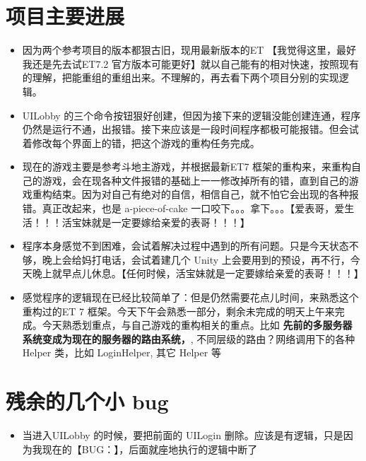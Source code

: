 \documentclass[9pt, b5paper]{article}
\begin{document}
\section{项目主要进展}
\label{sec-3}
\begin{itemize}
\item 因为两个参考项目的版本都狠古旧，现用最新版本的ET 【我觉得这里，最好我还是先去试ET7.2 官方版本可能更好】就以自己能有的相对快速，按照现有的理解，把能重组的重组出来。不理解的，再去看下两个项目分别的实现逻辑。
\item UILobby 的三个命令按钮狠好创建，但因为接下来的逻辑没能创建连通，程序仍然是运行不通，出报错。接下来应该是一段时间程序都极可能报错。但会试着修改每个界面上的错，把这个游戏的重构任务完成。
\item 现在的游戏主要是参考斗地主游戏，并根据最新ET7 框架的重构来，来重构自己的游戏，会在现各种文件报错的基础上一一修改掉所有的错，直到自己的游戏重构结束。因为对自己有绝对的自信，相信自己，就不怕它会出现的各种报错。真正改起来，也是 a-piece-of-cake 一口咬下。。。拿下。。。【爱表哥，爱生活！！！活宝妹就是一定要嫁给亲爱的表哥！！！】
\item 程序本身感觉不到困难，会试着解决过程中遇到的所有问题。只是今天状态不够，晚上会给妈打电话，会试着建几个 Unity 上会要用到的预设，再不行，今天晚上就早点儿休息。【任何时候，活宝妹就是一定要嫁给亲爱的表哥！！！】
\item 感觉程序的逻辑现在已经比较简单了：但是仍然需要花点儿时间，来熟悉这个重构过的ET 7 框架。今天下午会熟悉一部分，剩余未完成的明天上午来完成。今天熟悉划重点，与自己游戏的重构相关的重点。比如 \textbf{先前的多服务器系统变成为现在的服务器的路由系统，}, 不同层级的路由？网络调用下的各种Helper 类，比如 LoginHelper, 其它 Helper 等
\end{itemize}
\section{残余的几个小 bug}
\label{sec-4}
\begin{itemize}
\item 当进入UILobby 的时候，要把前面的 UILogin 删除。应该是有逻辑，只是因为我现在的【BUG：】，后面就座地执行的逻辑中断了
\end{itemize}
\end{document}
